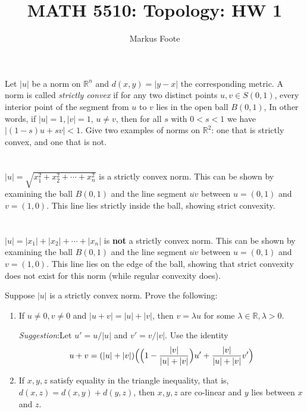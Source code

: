\documentclass{jhwhw}
\title{MATH 5510: Topology: HW 1}
\author{Markus Foote}
\begin{document}
\problem{}%
 Let $|u|$ be a norm on $\mathbb{R}^n$ and $d(x,y) = |y - x|$ the corresponding metric. A norm is called \emph{strictly convex} if for any two distinct points $u,v\in S(0,1)$, every interior point of the segment from $u$ to $v$ lies in the open ball $B(0,1)$,  In other words, if $|u|=1, |v| = 1$, $u\ne v$, then for all $s$ with $0<s<1$ we have $|(1-s) u + s v |   <1$.  Give two examples of norms on $\mathbb{R}^2$: one that is strictly convex, and one that is not.

\solution{}
\part{}
$|u| = \sqrt{x_1^2+x_2^2+\cdots+x_n^2}$ is a strictly convex norm. This can be shown by examining the ball $B(0,1)$ and the line segment $\overline{uv}$ between $u=(0,1)$ and $v=(1,0)$. This line lies strictly inside the ball, showing strict convexity.
\begin{center}
\end{center}

\part{}
$|u| = |x_1|+|x_2|+\cdots+|x_n|$ is \textbf{not} a strictly convex norm. This can be shown by examining the ball $B(0,1)$ and the line segment $\overline{uv}$ between $u=(0,1)$ and $v=(1,0)$. This line lies on the edge of the ball, showing that strict convexity does not exist for this norm (while regular convexity does).
\begin{center}
\end{center}


\problem{} %
Suppose $|u|$ is a strictly convex norm. Prove the following:
\begin{enumerate}
	\item If $u\ne 0, v\ne 0$ and $|u + v| = |u| + |v|$, then $v = \lambda u$ for some $\lambda \in \mathbb{R}, \lambda >0$.
	
	\emph{Suggestion}:Let $ u' = u/|u|$ and $v' = v/|v|$. Use the identity
	$$
	u + v = (|u| + |v|) \Big{(} \Big{(}1 - \frac{|v|}{|u| + |v|}\Big{) }u' + \frac{|v|}{|u|+ |v|} v' \Big{)}
	$$
	
	\item If $x,y,z$ satisfy equality in the triangle inequality, that is, $d(x,z) = d(x,y) + d(y,z)$, then $x,y,z$ are co-linear and $y$ lies between $x$ and $z$.
\end{enumerate}
\end{document}
